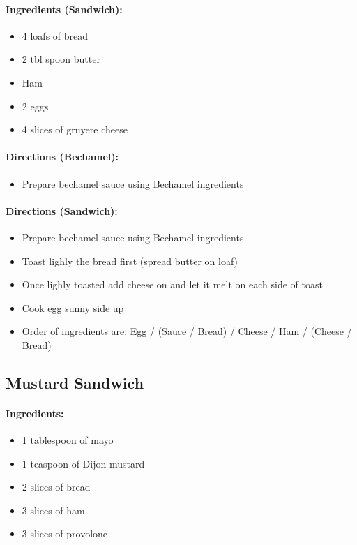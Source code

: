 \documentclass{article}
\begin{document}
\paragraph{Ingredients (Sandwich):}
\begin{itemize}
	\item 4 loafs of bread
	\item 2 tbl spoon butter
	\item Ham
	\item 2 eggs
	\item 4 slices of gruyere cheese
\end{itemize}

\paragraph{Directions (Bechamel):}
\begin{itemize}
	\item Prepare bechamel sauce using Bechamel ingredients
\end{itemize}

\paragraph{Directions (Sandwich):}
\begin{itemize}
	\item Prepare bechamel sauce using Bechamel ingredients
	\item Toast lighly the bread first (spread butter on loaf)
	\item Once lighly toasted add cheese on and let it melt on each side of toast
	\item Cook egg sunny side up
	\item Order of ingredients are: Egg / (Sauce / Bread) / Cheese / Ham / (Cheese / Bread)
\end{itemize}


\subsection{Mustard Sandwich}

\paragraph{Ingredients:}

\begin{itemize}
	\item 1 tablespoon of mayo 
	\item 1 teaspoon of Dijon mustard 
	\item 2 slices of bread 
	\item 3 slices of ham 
	\item 3 slices of provolone
\end{itemize}
\end{document}
